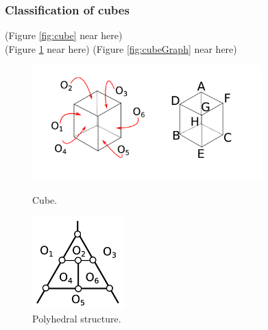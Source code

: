 \documentclass[suppldata, dvipdfmx]{interact}
\theoremstyle{plain}%
\theoremstyle{definition}
\theoremstyle{remark}
\theoremstyle{problemstyle}
\begin{document}
\subsubsection{Classification of cubes}

\noindent(Figure \ref{fig:cube} near here)\\
(Figure \ref{fig:cubePolyhedralStructure} near here)
\noindent(Figure \ref{fig:cubeGraph}
 near here)

\begin{figure}[h!tbp]
  \begin{minipage}[t]{0.66\textwidth}
 \centering
 \includegraphics[width=3.5in,
 keepaspectratio]{./img/HexahedraWithSphericalFaces/cubes.jpg}
 \caption{Cube.}
 \label{fig:cube}
  \end{minipage}
 \hspace*{\fill}
  \begin{minipage}[t]{0.33\textwidth}
   \centering
   \includegraphics[width=1.4in, keepaspectratio]{./img/HexahedraWithSphericalFaces/cube/cubeFaces.jpg}
   \caption{Polyhedral structure.}
   \label{fig:cubePolyhedralStructure}
  \end{minipage}
\end{figure}
\end{document}
